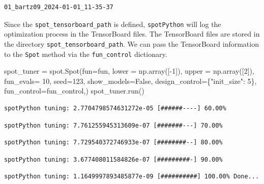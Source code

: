 \documentclass[
  letterpaper,
  DIV=11,
  numbers=noendperiod]{scrreprt}
\newenvironment{Shaded}{\begin{snugshade}}{\end{snugshade}}
\newcommand{\DecValTok}[1]{\textcolor[rgb]{0.68,0.00,0.00}{#1}}
\newcommand{\NormalTok}[1]{\textcolor[rgb]{0.00,0.23,0.31}{#1}}
\newcommand{\OperatorTok}[1]{\textcolor[rgb]{0.37,0.37,0.37}{#1}}
\newcommand{\StringTok}[1]{\textcolor[rgb]{0.13,0.47,0.30}{#1}}
\newcommand{\VariableTok}[1]{\textcolor[rgb]{0.07,0.07,0.07}{#1}}
\begin{document}
\begin{verbatim}
01_bartz09_2024-01-01_11-35-37
\end{verbatim}

Since the \texttt{spot\_tensorboard\_path} is defined,
\texttt{spotPython} will log the optimization process in the TensorBoard
files. The TensorBoard files are stored in the directory
\texttt{spot\_tensorboard\_path}. We can pass the TensorBoard
information to the \texttt{Spot} method via the \texttt{fun\_control}
dictionary.

\begin{Shaded}
\begin{Highlighting}[]
\NormalTok{spot\_tuner }\OperatorTok{=}\NormalTok{ spot.Spot(fun}\OperatorTok{=}\NormalTok{fun,}
\NormalTok{                   lower }\OperatorTok{=}\NormalTok{ np.array([}\OperatorTok{{-}}\DecValTok{1}\NormalTok{]),}
\NormalTok{                   upper }\OperatorTok{=}\NormalTok{ np.array([}\DecValTok{2}\NormalTok{]),}
\NormalTok{                   fun\_evals}\OperatorTok{=} \DecValTok{10}\NormalTok{,}
\NormalTok{                   seed}\OperatorTok{=}\DecValTok{123}\NormalTok{,}
\NormalTok{                   show\_models}\OperatorTok{=}\VariableTok{False}\NormalTok{,}
\NormalTok{                   design\_control}\OperatorTok{=}\NormalTok{\{}\StringTok{"init\_size"}\NormalTok{: }\DecValTok{5}\NormalTok{\},}
\NormalTok{                   fun\_control}\OperatorTok{=}\NormalTok{fun\_control,)}
\NormalTok{spot\_tuner.run()}
\end{Highlighting}
\end{Shaded}

\begin{verbatim}
spotPython tuning: 2.7704798574631272e-05 [######----] 60.00% 
\end{verbatim}

\begin{verbatim}
spotPython tuning: 7.761255945313609e-07 [#######---] 70.00% 
\end{verbatim}

\begin{verbatim}
spotPython tuning: 7.729540372746933e-07 [########--] 80.00% 
\end{verbatim}

\begin{verbatim}
spotPython tuning: 3.677408011584826e-07 [#########-] 90.00% 
\end{verbatim}

\begin{verbatim}
spotPython tuning: 1.1649997893485877e-09 [##########] 100.00% Done...
\end{verbatim}
\end{document}
